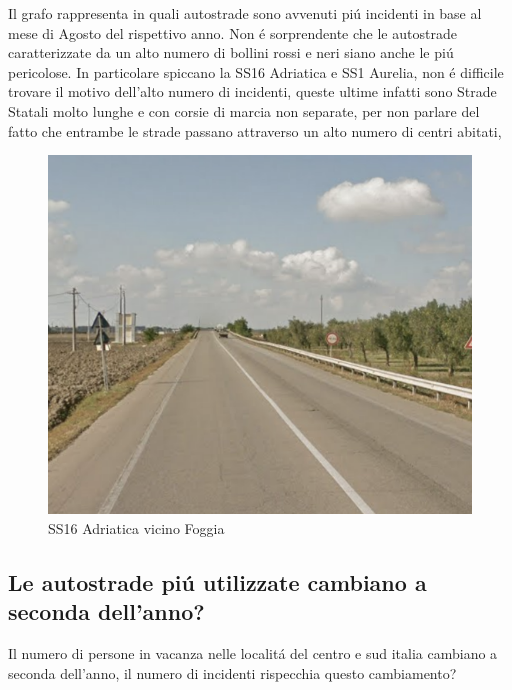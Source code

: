 \documentclass[a4paper]{report}
\begin{document}
Il grafo rappresenta in quali autostrade sono avvenuti pi\'u incidenti in base al mese di Agosto
del rispettivo anno.
Non \'e sorprendente che le autostrade caratterizzate da un alto numero di bollini rossi e neri 
siano anche le pi\'u pericolose.
In particolare spiccano la SS16 Adriatica e SS1 Aurelia, non \'e difficile trovare il motivo dell'alto numero di incidenti, 
queste ultime infatti sono Strade Statali molto lunghe e con corsie di marcia non separate, 
per non parlare del fatto che entrambe le strade passano attraverso un alto numero di centri abitati, 

\begin{figure}[!ht]
    \includegraphics[width=\linewidth]{../src/incidenti/incidenti_aci/agosto/adriatica.png}
    \caption{SS16 Adriatica vicino Foggia}
    \label{fig:adriatica}
\end{figure}

\clearpage
\subsection{Le autostrade pi\'u utilizzate cambiano a seconda dell'anno?}

Il numero di persone in vacanza nelle localit\'a del centro e sud italia cambiano 
a seconda dell'anno, il numero di incidenti rispecchia questo cambiamento?
\end{document}
